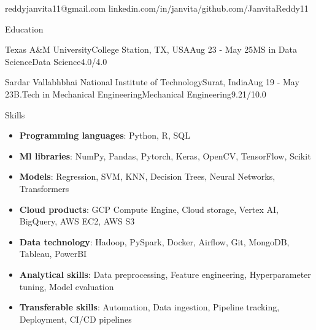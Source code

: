 \documentclass{resume}
\begin{document}
 {reddyjanvita11@gmail.com} {linkedin.com/in/janvita/}{github.com/JanvitaReddy11}
\begin{rSection}{Education}

\begin{rSubsectionedu}{Texas A\&M University}{College Station, TX, USA}{Aug 23 - May 25}{MS in Data Science}{Data Science}{4.0/4.0}

\end{rSubsectionedu}
\vspace{-15pt}

\begin{rSubsectionedu}{Sardar Vallabhbhai National Institute of Technology}{Surat, India}{Aug 19 - May 23}{B.Tech in Mechanical Engineering}{Mechanical Engineering}{9.21/10.0}

\end{rSubsectionedu}
\vspace{-15pt}
\end{rSection}
\begin{rSection}{Skills}
\begin{itemize}[left=0pt, label={}, align=parleft]
\vspace{-5pt}
\item [] \textbf{Programming languages}: {Python}, {R}, {SQL}
\vspace{-5pt}
\item [] \textbf{Ml libraries}: {NumPy}, {Pandas}, {Pytorch}, {Keras}, {OpenCV}, {TensorFlow}, {Scikit}
\vspace{-5pt}
\item [] \textbf{Models}: {Regression}, {SVM}, {KNN}, {Decision Trees}, {Neural Networks}, {Transformers}
\vspace{-5pt}
\item [] \textbf{Cloud products}: {GCP Compute Engine}, {Cloud storage}, {Vertex AI}, {BigQuery}, {AWS EC2}, {AWS S3}
\vspace{-5pt}
\item [] \textbf{Data technology}: {Hadoop}, {PySpark}, {Docker}, {Airflow}, {Git}, {MongoDB}, {Tableau}, {PowerBI}
\vspace{-5pt}
\item [] \textbf{Analytical skills}: {Data preprocessing}, {Feature engineering}, {Hyperparameter tuning}, {Model evaluation}
\vspace{-5pt}
\item [] \textbf{Transferable skills}: {Automation}, {Data ingestion}, {Pipeline tracking}, {Deployment}, {CI/CD pipelines}
\end{itemize}
\end{rSection}
\end{document}
